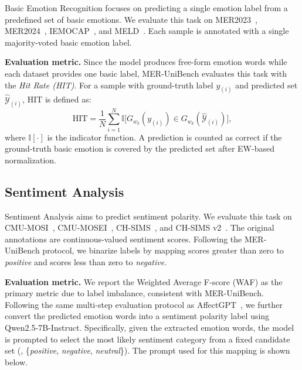 \documentclass{article}
\theoremstyle{plain}
\theoremstyle{definition}
\theoremstyle{remark}
\begin{document}
Basic Emotion Recognition focuses on predicting a single emotion label from a predefined set of basic emotions.
We evaluate this task on MER2023~\cite{lian2023mer}, MER2024~\cite{lian2024mer}, IEMOCAP~\cite{busso2008iemocap}, and MELD~\cite{poria2019meld}.
Each sample is annotated with a single majority-voted basic emotion label.

\noindent\textbf{Evaluation metric.}
Since the model produces free-form emotion words while each dataset provides one basic label, MER-UniBench evaluates this task with the \emph{Hit Rate (HIT)}.
For a sample with ground-truth label $y_{(i)}$ and predicted set $\hat{\mathcal{Y}}_{(i)}$, HIT is defined as:
\begin{equation}
\mathrm{HIT} = \frac{1}{N}\sum_{i=1}^{N}
\mathbb{I}\bigl[G_{w_k}(y_{(i)}) \in G_{w_k}(\hat{\mathcal{Y}}_{(i)})\bigr],
\end{equation}
where $\mathbb{I}[\cdot]$ is the indicator function.
A prediction is counted as correct if the ground-truth basic emotion is covered by the predicted set after EW-based normalization.


\subsection{Sentiment Analysis}
\label{appendix:sentiment-analysis}

Sentiment Analysis aims to predict sentiment polarity.
We evaluate this task on CMU-MOSI~\cite{zadeh2016mosi}, CMU-MOSEI~\cite{zadeh2018multimodal}, CH-SIMS~\cite{yu2020ch}, and CH-SIMS v2~\cite{liu2022make}.
The original annotations are continuous-valued sentiment scores.
Following the MER-UniBench protocol, we binarize labels by mapping scores greater than zero to \emph{positive} and scores less than zero to \emph{negative}.

\noindent\textbf{Evaluation metric.}
We report the Weighted Average F-score (WAF) as the primary metric due to label imbalance, consistent with MER-UniBench.
Following the same multi-step evaluation protocol as AffectGPT~\cite{lian2025affectgpt}, we further convert the predicted emotion words into a sentiment polarity label using Qwen2.5-7B-Instruct.
Specifically, given the extracted emotion words, the model is prompted to select the most likely sentiment category from a fixed candidate set (\eg, \{\emph{positive}, \emph{negative}, \emph{neutral}\}).
The prompt used for this mapping is shown below.
\end{document}
